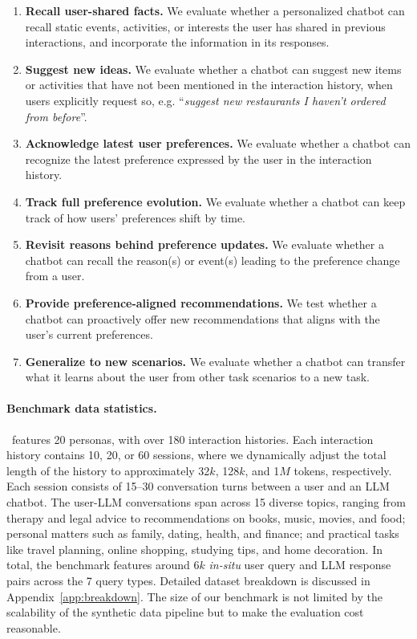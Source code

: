 \begin{enumerate}[left=0pt, itemsep=2pt]
    \item \textbf{Recall user-shared facts.} We evaluate whether a personalized chatbot can recall static events, activities, or interests the user has shared in previous interactions, and incorporate the information in its responses.
    \item \textbf{Suggest new ideas.} We evaluate whether a chatbot can suggest new items or activities that have not been mentioned in the interaction history, when users explicitly request so, e.g. ``\textit{suggest new restaurants I haven't ordered from before}''.
    \item \textbf{Acknowledge latest user preferences.} We evaluate whether a chatbot can recognize the latest preference expressed by the user in the interaction history.
    \item \textbf{Track full preference evolution.} We evaluate whether a chatbot can keep track of how users' preferences shift by time.
    \item \textbf{Revisit reasons behind preference updates.} We evaluate whether a chatbot can recall the reason(s) or event(s) leading to the preference change from a user.  
    \item \textbf{Provide preference-aligned recommendations.} We test whether a chatbot can proactively offer new recommendations
    that aligns with the user's current preferences.
    \item \textbf{Generalize to new scenarios.} We evaluate whether a chatbot can transfer what it learns about the user from other task scenarios to a new task.  
\end{enumerate}

\paragraph{Benchmark data statistics.}
\datasetnameemoji~features 20 personas, with over 180 interaction histories. Each interaction history contains 10, 20, or 60 sessions, where we dynamically adjust the total length of the history to approximately 32$k$, 128$k$, and 1$M$ tokens, respectively. Each session consists of 15–30 conversation turns between a user and an LLM chatbot. The user-LLM conversations span across 15 diverse topics, ranging from therapy and legal advice to recommendations on books, music, movies, and food; personal matters such as family, dating, health, and finance; and practical tasks like travel planning, online shopping, studying tips, and home decoration. In total, the benchmark features around 6$k$ \emph{in-situ} user query and LLM response pairs across the 7 query types. Detailed dataset breakdown is discussed in Appendix~\ref{app:breakdown}. The size of our benchmark is not limited by the scalability of the synthetic data pipeline but to make the evaluation cost reasonable.

